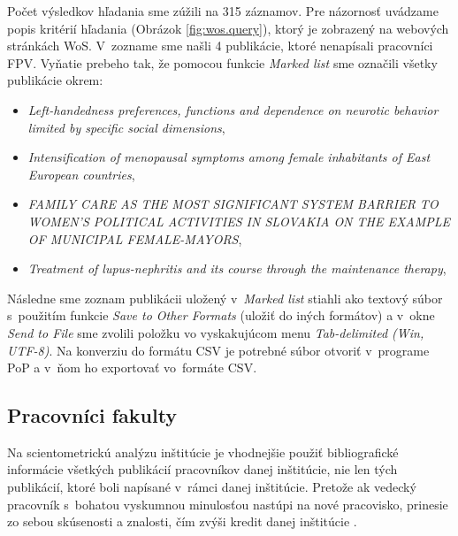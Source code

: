   Počet výsledkov hľadania sme zúžili na 315 záznamov. Pre názornosť uvádzame
  popis kritérií hľadania (Obrázok \ref{fig:wos.query}), ktorý je zobrazený na
  webových stránkách WoS.  V~zozname sme našli 4 publikácie, ktoré nenapísali
  pracovníci FPV.  Vyňatie prebeho tak, že pomocou funkcie \emph{Marked list} sme
  označili všetky publikácie okrem:

  \begin{itemize}
    \item \emph{Left-handedness preferences, functions and dependence on neurotic
      behavior limited by specific social dimensions},
    \item \emph{Intensification of menopausal symptoms among female inhabitants
      of East European countries},
    \item \emph{FAMILY CARE AS THE MOST SIGNIFICANT SYSTEM BARRIER TO WOMEN'S
      POLITICAL ACTIVITIES IN SLOVAKIA ON THE EXAMPLE OF MUNICIPAL
      FEMALE-MAYORS},
    \item \emph{Treatment of lupus-nephritis and its course through the
      maintenance therapy},
  \end{itemize}

  Následne sme zoznam publikácii uložený v~\emph{Marked list} stiahli ako textový
  súbor s~použitím funkcie \emph{Save to Other Formats} (uložiť do iných
  formátov) a v~okne \emph{Send to File} sme zvolili položku vo vyskakujúcom menu
  \emph{Tab-delimited (Win, UTF-8)}. Na konverziu do formátu CSV je potrebné
  súbor otvoriť v~programe PoP \citep{Harzing2011} a v~ňom ho exportovať vo~formáte CSV.

  \subsection{Pracovníci fakulty}
  \label{sec:staff.mining}

  Na scientometrickú analýzu inštitúcie je vhodnejšie použiť bibliografické
  informácie všetkých publikácií pracovníkov danej inštitúcie, nie len tých
  publikácií, ktoré boli napísané v~rámci danej inštitúcie. Pretože ak vedecký
  pracovník s~bohatou vyskumnou minulosťou nastúpi na nové pracovisko, prinesie
  zo sebou skúsenosti a znalosti, čím zvýši kredit danej inštitúcie
  \citep{Altanopoulou2012}.

